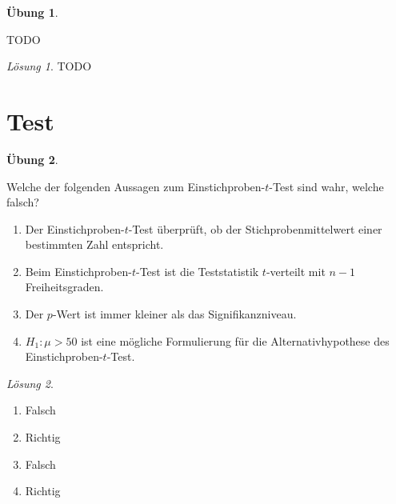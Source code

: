 \documentclass[
]{book}
\providecommand{\tightlist}{%
  \setlength{\itemsep}{0pt}\setlength{\parskip}{0pt}}
\theoremstyle{definition}
\theoremstyle{definition}
\theoremstyle{definition}
\newtheorem{exercise}{Übung}[chapter]
\theoremstyle{definition}
\theoremstyle{remark}
\newtheorem*{solution}{Lösung}
\begin{document}
\begin{exercise}
\protect\hypertarget{exr:aslkdfjoeiu12342}{}\label{exr:aslkdfjoeiu12342}\leavevmode

TODO

\end{exercise}

\begin{solution}
TODO
\end{solution}

\section{Test}\label{test-2}

\begin{exercise}
\protect\hypertarget{exr:test-theorie}{}\label{exr:test-theorie}

Welche der folgenden Aussagen zum Einstichproben-\(t\)-Test sind wahr, welche falsch?

\begin{enumerate}
\def\labelenumi{\alph{enumi})}
\tightlist
\item
  Der Einstichproben-\(t\)-Test überprüft, ob der Stichprobenmittelwert einer bestimmten Zahl entspricht.
\item
  Beim Einstichproben-\(t\)-Test ist die Teststatistik \(t\)-verteilt mit \(n-1\) Freiheitsgraden.
\item
  Der \(p\)-Wert ist immer kleiner als das Signifikanzniveau.
\item
  \(H_1: \mu > 50\) ist eine mögliche Formulierung für die Alternativhypothese des Einstichproben-\(t\)-Test.
\end{enumerate}

\end{exercise}

\begin{solution}
\leavevmode

\begin{enumerate}
\def\labelenumi{\alph{enumi})}
\tightlist
\item
  Falsch
\item
  Richtig
\item
  Falsch
\item
  Richtig
\end{enumerate}

\end{solution}
\end{document}
